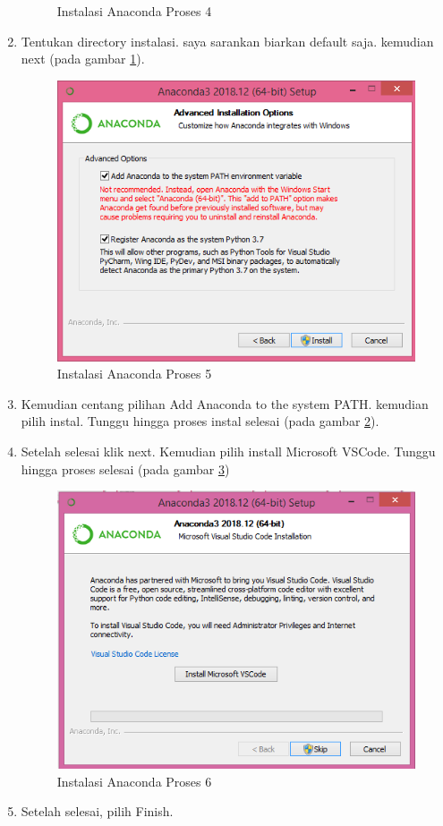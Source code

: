\begin{enumerate}
\begin{figure}[h!]
	  \caption{Instalasi Anaconda Proses 4}
	  \label{labelgambar5}
	  \end{figure}
  \item Tentukan directory instalasi. saya sarankan biarkan default saja. kemudian next (pada gambar \ref{labelgambar5}).
\begin{figure}[h!]
	  \centering
	  \includegraphics[scale=0.4]{figures/instal/5.PNG}
	  \caption{Instalasi Anaconda Proses 5}
	  \label{labelgambar6}
	  \end{figure}
  \item Kemudian centang pilihan Add Anaconda to the system PATH. kemudian pilih instal. Tunggu hingga proses instal selesai (pada gambar \ref{labelgambar6}).
  \item Setelah selesai klik next. Kemudian pilih install Microsoft VSCode. Tunggu hingga proses selesai (pada gambar \ref{labelgambar7})
      \begin{figure}[h!]
	  \centering
	  \includegraphics[scale=0.4]{figures/instal/8.PNG}
	  \caption{Instalasi Anaconda Proses 6}
	  \label{labelgambar7}
	  \end{figure}
  \item Setelah selesai, pilih Finish.

\end{enumerate}
